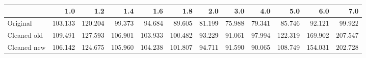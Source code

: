 \begin{tabular}{lrrrrrrrrrrr}
\toprule
{} &     1.0 &     1.2 &     1.4 &     1.6 &     1.8 &    2.0 &    3.0 &    4.0 &     5.0 &     6.0 &     7.0 \\
\midrule
Original    & 103.133 & 120.204 &  99.373 &  94.684 &  89.605 & 81.199 & 75.988 & 79.341 &  85.746 &  92.121 &  99.922 \\
Cleaned old & 109.491 & 127.593 & 106.901 & 103.933 & 100.482 & 93.229 & 91.061 & 97.994 & 122.319 & 169.902 & 207.547 \\
Cleaned new & 106.142 & 124.675 & 105.960 & 104.238 & 101.807 & 94.711 & 91.590 & 90.065 & 108.749 & 154.031 & 202.728 \\
\bottomrule
\end{tabular}
